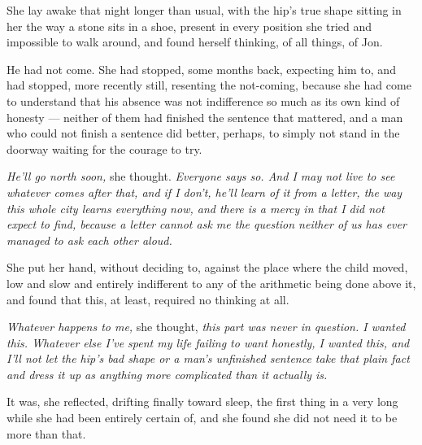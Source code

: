 \sceneBreak

She lay awake that night longer than usual, with the hip’s true shape sitting in her the way a stone sits in a shoe, present in every position she tried and impossible to walk around, and found herself thinking, of all things, of Jon.

He had not come. She had stopped, some months back, expecting him to, and had stopped, more recently still, resenting the not-coming, because she had come to understand that his absence was not indifference so much as its own kind of honesty — neither of them had finished the sentence that mattered, and a man who could not finish a sentence did better, perhaps, to simply not stand in the doorway waiting for the courage to try.

\textit{He’ll go north soon,} she thought. \textit{Everyone says so. And I may not live to see whatever comes after that, and if I don’t, he’ll learn of it from a letter, the way this whole city learns everything now, and there is a mercy in that I did not expect to find, because a letter cannot ask me the question neither of us has ever managed to ask each other aloud.}

She put her hand, without deciding to, against the place where the child moved, low and slow and entirely indifferent to any of the arithmetic being done above it, and found that this, at least, required no thinking at all.

\textit{Whatever happens to me,} she thought, \textit{this part was never in question. I wanted this. Whatever else I’ve spent my life failing to want honestly, I wanted this, and I’ll not let the hip’s bad shape or a man’s unfinished sentence take that plain fact and dress it up as anything more complicated than it actually is.}

It was, she reflected, drifting finally toward sleep, the first thing in a very long while she had been entirely certain of, and she found she did not need it to be more than that.
